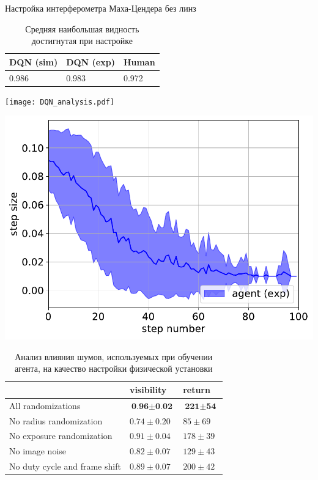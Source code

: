 \begin{frame}[allowframebreaks]{Настройка интерферометра Маха-Цендера без линз}
\begin{table} [htbp]
    \centering
    \begin{threeparttable}
        \caption*{Средняя наибольшая видность достигнутая при настройке}
        \begin{tabular}{| p{3cm} || p{3cm} || p{3cm} |}
            \hline
            \hline
            DQN (sim) & DQN (exp) & Human \\
            \hline
            0.986 & 0.983 & 0.972 \\
            \hline
            \hline
        \end{tabular}
    \end{threeparttable}
\end{table}
\framebreak
\begin{minipage}{\textwidth}
\texttt{[image: DQN\_analysis.pdf]}
\end{minipage}
\begin{minipage}{\textwidth}
\includegraphics[width=0.5\linewidth]{images/agent_step_size.pdf}
\end{minipage}

\framebreak 

\begin{table} [htbp]
    \centering
    \begin{threeparttable}
        \caption*{Анализ влияния шумов, используемых при обучении агента, на качество настройки физической установки}
        \begin{tabular}{| p{5cm} || p{2cm} || p{2cm} |}
            \hline
            \hline
             & visibility & return \\
            \hline
            All randomizations  & $\textbf{0.96} \pm \textbf{0.02}$ & $\textbf{221} \pm \textbf{54}$ \\
            No radius randomization & $0.74 \pm 0.20$ & $85 \pm 69$ \\
            No exposure randomization& $0.91 \pm 0.04$ & $178 \pm 39$ \\
            No image noise & $0.82 \pm 0.07$ & $129 \pm 43$ \\
            No duty cycle and frame shift  &  $0.89 \pm 0.07$ & $200 \pm 42$ \\
            \hline
            \hline
        \end{tabular}
    \end{threeparttable}
\end{table}
\end{frame}

